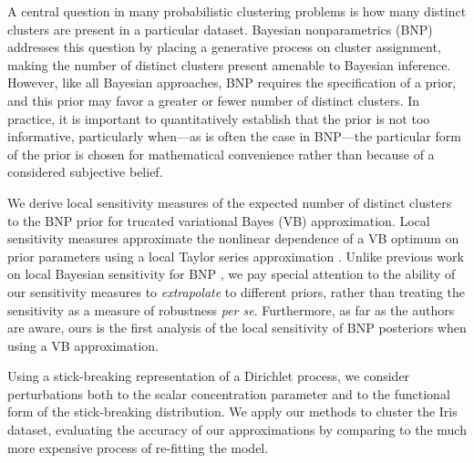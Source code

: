 
A central question in many probabilistic clustering problems is how many
distinct clusters are present in a particular dataset.
Bayesian nonparametrics (BNP) addresses this question by placing a generative
process on cluster assignment, making the number of distinct clusters present
amenable to Bayesian inference.  However, like all Bayesian approaches, BNP
requires the specification of a prior, and this prior may favor a greater or
fewer number of distinct clusters.
In practice, it is important to quantitatively establish that the prior is
not too informative, particularly when---as is often the case in BNP---the
particular form of the prior is chosen for mathematical convenience rather than
because of a considered subjective belief.

We derive local sensitivity measures of the expected number of distinct clusters
to the BNP prior for trucated variational Bayes (VB) approximation.  Local
sensitivity measures approximate the nonlinear dependence of a VB optimum on
prior parameters using a local Taylor series approximation
\citep{gustafson:1996:localposterior, giordano:2017:covariances}. Unlike
previous work on local Bayesian sensitivity for BNP
\citep{Basu:2000:BNP_robustness}, we pay special attention to the ability of our
sensitivity measures to \emph{extrapolate} to different priors, rather than
treating the sensitivity as a measure of robustness \textit{per se}.
Furthermore, as far as the authors are aware, ours is the first analysis of the
local sensitivity of BNP posteriors when using a VB approximation.


Using a stick-breaking representation of a Dirichlet process, we consider
perturbations both to the scalar concentration parameter and to the functional
form of the stick-breaking distribution. We apply our methods to cluster the
Iris \citep{iris_data_anderson, iris_data_fisher} dataset, evaluating the
accuracy of our approximations by comparing to the much more expensive process
of re-fitting the model.

